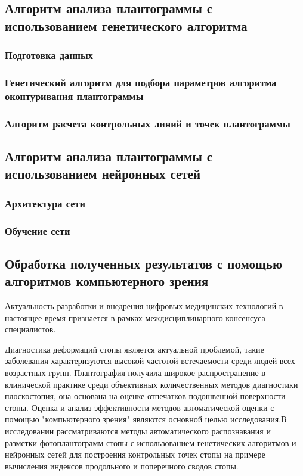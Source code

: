 \documentclass[coursework]{SCWorks}
\begin{document}
\subsection{Алгоритм анализа плантограммы с использованием генетического
алгоритма}
\subsubsection{Подготовка данных}
\subsubsection{Генетический алгоритм для подбора параметров алгоритма
оконтуривания плантограммы}
\subsubsection{Алгоритм расчета контрольных линий и точек плантограммы}
\subsection{Алгоритм анализа плантограммы с использованием нейронных
сетей
}
\subsubsection{Архитектура сети}
\subsubsection{Обучение сети}
\subsection{Обработка полученных результатов с помощью алгоритмов
компьютерного зрения}


\conclusion
Актуальность разработки и внедрения цифровых медицинских технологий в настоящее
время признается в рамках междисциплинарного консенсуса специалистов.


Диагностика деформаций стопы является актуальной проблемой, такие заболевания характеризуются высокой частотой встечаемости среди людей всех возрастных групп. Плантография получила широкое распространение в клинической практике среди объективных количественных методов диагностики плоскостопия, она основана на оценке отпечатков подошвенной поверхности стопы. Оценка и анализ эффективности методов автоматической оценки с помощью "компьютерного зрения" являются основной целью исследования.В
исследовании рассматриваются методы автоматического распознавания и разметки фотоплантограмм
стопы с использованием генетических алгоритмов и нейронных сетей для построения контрольных
точек стопы на примере вычисления индексов продольного и поперечного сводов стопы.
\end{document}
